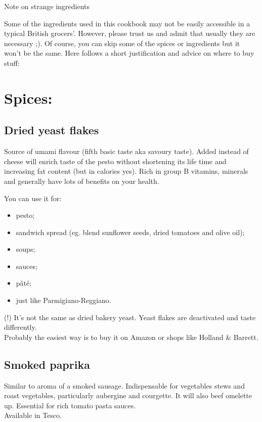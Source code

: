 \documentclass[12pt,a4paper]{article}
\begin{document}
	
	\begin{center}
		{\Large Note on strange ingredients}
	\end{center}
 
	Some of the ingredients used in this cookbook may not be easily accessible in a typical British grocers'. However, please trust us and admit that usually they are necessary ;). Of course, you can skip some of the spices or ingredients but it won't be the same. Here follows a short justification and advice on where to buy stuff: 
	
	\section*{Spices:}
	
	\subsection* {Dried yeast flakes}
	
	Source of umami flavour (fifth basic taste aka savoury taste). Added instead of cheese will enrich taste of the pesto without shortening its life time and increasing fat content (but in calories yes). Rich in group B vitamins, minerals and generally have lots of benefits on your health. 
	
	You can use it for:
	
	\begin{itemize}
		\setlength\itemsep{0.1mm}
		\item pesto;
		\item sandwich spread (eg. blend sunflower seeds, dried tomatoes and olive oil);
		\item soups;
		\item sauces; 
		\item pâté;
		\item just like Parmigiano-Reggiano.
		\end{itemize}
	
	(!) It's not the same as dried bakery yeast. Yeast flakes are deactivated and taste differently.
	\\
	Probably the easiest way is to buy it on Amazon or shops like Holland \& Barrett.

	\subsection* {Smoked paprika}
	Similar to aroma of a smoked sausage. Indispensable for vegetables stews and roast vegetables, particularly aubergine and courgette. It will also beef omelette up.  Essential for rich tomato pasta sauces.\\
	Available in Tesco. 
	
\end{document}
